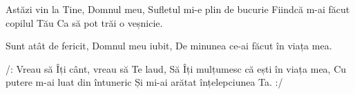 
\beginverse
Astăzi vin la Tine, Domnul meu,
Sufletul mi-e plin de bucurie
Fiindcă m-ai făcut copilul Tău
Ca să pot trăi o veșnicie.
\endverse

\beginverse*
Sunt atât de fericit,
Domnul meu iubit,
De minunea ce-ai făcut în viața mea.
\endverse

\beginchorus
/: Vreau să Îți cânt, vreau să Te laud, 
Să Îți mulțumesc că ești în viața mea, 
Cu putere m-ai luat din întuneric 
Și mi-ai arătat înțelepciunea Ta. :/
\endchorus

\endsong